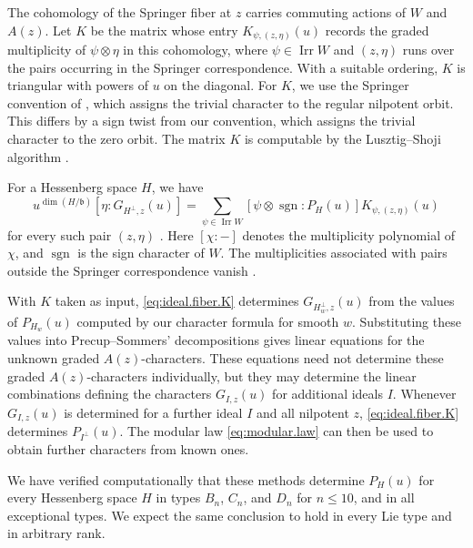 \documentclass[11pt]{amsart}
\numberwithin{equation}{section}
\theoremstyle{definition}
\def\beq{\begin{equation}}
\def\eeq{\end{equation}}
\DeclareMathOperator{\Irr}{\mathrm{Irr}}
\def\fb{\mathfrak {b}}
\begin{document}
The cohomology of the Springer fiber at $z$ carries commuting actions of $W$ and $A(z)$.
Let $K$ be the matrix whose entry $K_{\psi,(z,\eta)}(u)$ records the graded multiplicity of $\psi\otimes\eta$ in this cohomology, where $\psi\in\Irr W$ and $(z,\eta)$ runs over the pairs occurring in the Springer correspondence.
With a suitable ordering, $K$ is triangular with powers of $u$ on the diagonal.
For $K$, we use the Springer convention of \cite[Section~4]{PS}, which assigns the trivial character to the regular nilpotent orbit.
This differs by a sign twist from our convention, which assigns the trivial character to the zero orbit.
The matrix $K$ is computable by the Lusztig--Shoji algorithm
\cite[Section~24]{Lus86v}.

For a Hessenberg space $H$, we have
\beq\label{eq:ideal.fiber.K}
u^{\dim(H/\fb)}[\eta:G_{H^\perp,z}(u)]=\sum_{\psi\in\Irr W}[\psi\otimes\operatorname{sgn}:P_H(u)]
K_{\psi,(z,\eta)}(u)
\eeq
for every such pair $(z,\eta)$ \cite[(4.7) and Proposition~5.2]{PS}.
Here $[\chi:-]$ denotes the multiplicity polynomial of $\chi$, and $\operatorname{sgn}$ is the sign character of $W$.
The multiplicities associated with pairs outside the Springer correspondence vanish \cite[Section~4]{PS}.


With $K$ taken as input, \eqref{eq:ideal.fiber.K} determines $G_{H_w^\perp,z}(u)$ from the values of $P_{H_w}(u)$ computed by our character formula for smooth $w$.
Substituting these values into Precup--Sommers' decompositions gives linear equations for the unknown graded $A(z)$-characters.  %
These equations need not determine these graded $A(z)$-characters %
individually, but they may determine the linear combinations defining the characters $G_{I,z}(u)$ for additional ideals $I$.
Whenever $G_{I,z}(u)$ is determined for a further ideal $I$ and all nilpotent $z$, \eqref{eq:ideal.fiber.K} determines $P_{I^\perp}(u)$.
The modular law \eqref{eq:modular.law} can then be used to obtain further characters from known ones.

We have verified computationally that these methods determine $P_H(u)$ for every Hessenberg space $H$ in types $B_n$, $C_n$, and $D_n$ for $n\leq10$, and in all exceptional types.
We expect the same conclusion to hold in every Lie type and in arbitrary rank.
\end{document}
